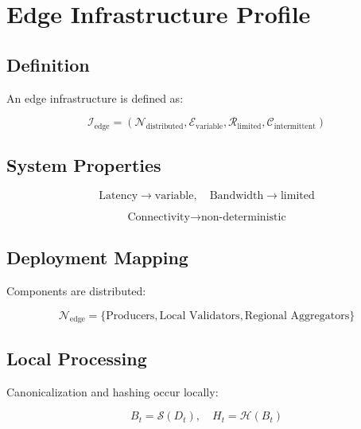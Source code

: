 \section{Edge Infrastructure Profile}

\subsection{Definition}

An edge infrastructure is defined as:

\begin{equation}
\mathcal{I}_{\text{edge}} = (\mathcal{N}_{\text{distributed}}, \mathcal{E}_{\text{variable}}, \mathcal{R}_{\text{limited}}, \mathcal{C}_{\text{intermittent}})
\end{equation}

\subsection{System Properties}

\begin{equation}
\text{Latency} \rightarrow \text{variable}, \quad \text{Bandwidth} \rightarrow \text{limited}
\end{equation}

\begin{equation}
\text{Connectivity} \rightarrow \text{non-deterministic}
\end{equation}

\subsection{Deployment Mapping}

Components are distributed:

\begin{equation}
\mathcal{N}_{\text{edge}} = \{\text{Producers}, \text{Local Validators}, \text{Regional Aggregators}\}
\end{equation}

\subsection{Local Processing}

Canonicalization and hashing occur locally:

\begin{equation}
B_t = \mathcal{S}(D_t), \quad H_t = \mathcal{H}(B_t)
\end{equation}

